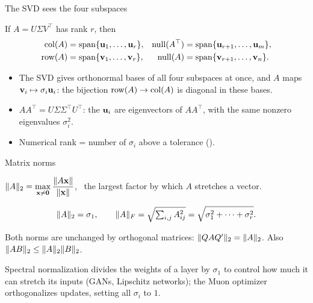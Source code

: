 \documentclass[aspectratio=1610,11pt]{beamer}
\begin{document}
\begin{frame}{The SVD sees the four subspaces}
    \begin{proposition}
        If $A = U\Sigma V^\top$ has rank $r$, then
        \[\begin{aligned}
            \operatorname{col}(A) &= \operatorname{span}\{\mathbf{u}_1, \ldots, \mathbf{u}_r\}, & \operatorname{null}(A^\top) &= \operatorname{span}\{\mathbf{u}_{r+1}, \ldots, \mathbf{u}_m\}, \\
            \operatorname{row}(A) &= \operatorname{span}\{\mathbf{v}_1, \ldots, \mathbf{v}_r\}, & \operatorname{null}(A) &= \operatorname{span}\{\mathbf{v}_{r+1}, \ldots, \mathbf{v}_n\}.
        \end{aligned}\]
    \end{proposition}
    \small
    \begin{itemize}
        \item The SVD gives orthonormal bases of all four subspaces at once, and $A$ maps $\mathbf{v}_i \mapsto \sigma_i\mathbf{u}_i$: the bijection $\operatorname{row}(A) \to \operatorname{col}(A)$ is diagonal in these bases.
        \item $AA^\top = U\Sigma\Sigma^\top U^\top$: the $\mathbf{u}_i$ are eigenvectors of $AA^\top$, with the same nonzero eigenvalues $\sigma_i^2$.
        \item Numerical rank = number of $\sigma_i$ above a tolerance ().
    \end{itemize}
\end{frame}

\begin{frame}{Matrix norms}
    \begin{definition}
        \(\displaystyle\lVert A \rVert_2 = \max_{\mathbf{x} \neq \mathbf{0}}\frac{\lVert A\mathbf{x} \rVert}{\lVert \mathbf{x} \rVert}\), \ the largest factor by which $A$ stretches a vector.
    \end{definition}
    \begin{proposition}
        \[\lVert A \rVert_2 = \sigma_1, \qquad \lVert A \rVert_F = \sqrt{\textstyle\sum_{i,j}A_{ij}^2} = \sqrt{\sigma_1^2 + \cdots + \sigma_r^2}.\]
    \end{proposition}
    \small
    Both norms are unchanged by orthogonal matrices: $\lVert QAQ' \rVert_2 = \lVert A \rVert_2$. Also $\lVert AB \rVert_2 \leq \lVert A \rVert_2\lVert B \rVert_2$.
    \begin{mlbox}
        \small Spectral normalization divides the weights of a layer by $\sigma_1$ to control how much it can stretch its inputs (GANs, Lipschitz networks); the Muon optimizer orthogonalizes updates, setting all $\sigma_i$ to $1$.
    \end{mlbox}
\end{frame}
\end{document}
